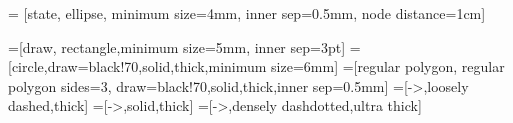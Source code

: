 \newcommand{\bracket}[1]{\left(#1\right)}
\newcommand{\prob}[1]{P\left[#1\right]}
\newcommand{\underbraceset}[2]{\underset{#1}{\underbrace{#2}}}
\newcommand{\rfrac}[2]{\ ^{#1} \!/_{#2}}
\newcommand{\atmost}[1]{\ensuremath{\mathcal{O}(#1)}}
\newcommand{\ceil}[1]{\left\lceil #1 \right\rceil}
\newcommand{\floor}[1]{\left\lfloor #1 \right\rfloor}





\providecommand{\abs}[1]{\lvert#1\rvert}

\newcommand{\defn}{\,\triangleq\,}

\newcommand{\turner}[3][10em]{%
  \rlap{\rotatebox{#2}{\begin{varwidth}[t]{#1}#3\end{varwidth}}}%
}



 = [state, ellipse, minimum size=4mm, inner sep=0.5mm, node distance=1cm]

=[draw, rectangle,minimum size=5mm, inner sep=3pt]
=[circle,draw=black!70,solid,thick,minimum size=6mm]
=[regular polygon, regular polygon sides=3, draw=black!70,solid,thick,inner sep=0.5mm]
=[->,loosely dashed,thick]
=[->,solid,thick]
=[->,densely dashdotted,ultra thick]




\before{\prec}
\beforeq{\preccurlyeq}




\newcommand{\expval}[1]{\langle #1 \rangle}
\newcommand{\dyad}[1]{| #1 \rangle \langle #1 |}
\newenvironment{smallmat}{\left[\begin{smallmatrix}}{\end{smallmatrix}\right]}
\newcommand{\Iso}{\ensuremath{\text{Iso}}}
\newcommand{\Stab}{\ensuremath{\text{Stab}}}
\newcommand{\Aut}{\ensuremath{\text{Stab}}}

\newcommand\local[5]{\begin{smallmat}#5{#1} & #5{#2} \\ #5{#3} & #5{#4}\end{smallmat}\xspace}
\newcommand\anti[1]{\begin{smallmat}0 & #1 \\ 1 & 0\end{smallmat}\xspace}
\newcommand\diag[1]{\begin{smallmat}1 & 0 \\  0 & #1\end{smallmat}\xspace}

